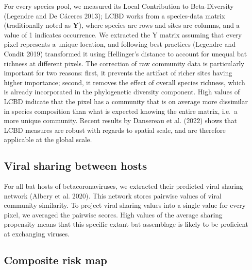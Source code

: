 \documentclass[11pt]{article}
\begin{document}
For every species pool, we measured its Local Contribution to
Beta-Diversity (Legendre and De Cáceres 2013); LCBD works from a
species-data matrix (traditionally noted as \(\mathbf{Y}\)), where
species are rows and sites are columns, and a value of 1 indicates
occurrence. We extracted the Y matrix assuming that every pixel
represents a unique location, and following best practices (Legendre and
Condit 2019) transformed it using Hellinger's distance to account for
unequal bat richness at different pixels. The correction of raw
community data is particularly important for two reasons: first, it
prevents the artifact of richer sites having higher importance; second,
it removes the effect of overall species richness, which is already
incorporated in the phylogenetic diversity component. High values of
LCBD indicate that the pixel has a community that is on average more
dissimilar in species composition than what is expected knowing the
entire matrix, i.e.~a more unique community. Recent results by Dansereau
et al. (2022) shows that LCBD measures are robust with regards to
spatial scale, and are therefore applicable at the global scale.

\hypertarget{viral-sharing-between-hosts}{%
\subsection{Viral sharing between
hosts}\label{viral-sharing-between-hosts}}

For all bat hosts of betacoronaviruses, we extracted their predicted
viral sharing network (Albery et al. 2020). This network stores pairwise
values of viral community similarity. To project viral sharing values
into a single value for every pixel, we averaged the pairwise scores.
High values of the average sharing propensity means that this specific
extant bat assemblage is likely to be proficient at exchanging viruses.

\hypertarget{composite-risk-map}{%
\subsection{Composite risk map}\label{composite-risk-map}}
\end{document}
